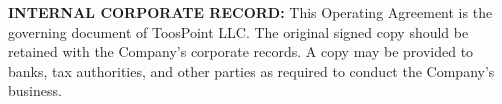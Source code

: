 \documentclass{toospoint}
\begin{document}
\vspace{20pt}

\noindent
{}

\vspace{32pt}

\begin{mdframed}[
  linecolor=TPBorder,
  linewidth=1pt,
  roundcorner=4pt,
  backgroundcolor=TPLight,
  innerleftmargin=14pt,
  innerrightmargin=14pt,
  innertopmargin=10pt,
  innerbottommargin=10pt
]
\sffamily\footnotesize\color{TPGray}
\textbf{INTERNAL CORPORATE RECORD:} This Operating Agreement is the
governing document of ToosPoint LLC. The original signed copy should be
retained with the Company's corporate records. A copy may be provided to
banks, tax authorities, and other parties as required to conduct the
Company's business.
\end{mdframed}
\end{document}
